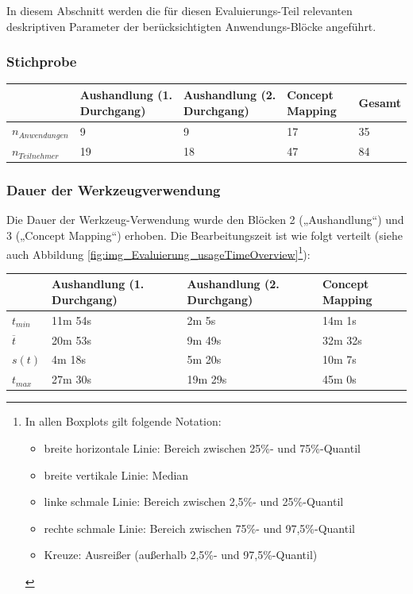 In diesem Abschnitt werden die für diesen Evaluierungs-Teil relevanten deskriptiven Parameter der berücksichtigten Anwendungs-Blöcke angeführt.

\subsubsection{Stichprobe} %

\begin{tabular}{| p{2cm} || p{} | p{} | p{} || p{2cm} |}
  \hline
   & Aushandlung (1. Durchgang) & Aushandlung (2. Durchgang) & Concept Mapping & Gesamt \\ \hline
   $n_{Anwendungen}$ & 9 & 9 & 17 & 35 \\ 
   $n_{Teilnehmer}$ & 19 & 18 & 47 & 84 \\ \hline
\end{tabular} 

\subsubsection{Dauer der Werkzeugverwendung} %

Die Dauer der Werkzeug-Verwendung wurde den Blöcken 2 („Aushandlung“) und 3 („Concept Mapping“) erhoben. Die Bearbeitungszeit ist wie folgt verteilt (siehe auch Abbildung \ref{fig:img_Evaluierung_usageTimeOverview}\footnote{In allen Boxplots gilt folgende Notation: 
\begin{itemize}
	\item breite horizontale Linie: Bereich zwischen 25\%- und 75\%-Quantil
	\item breite vertikale Linie: Median
	\item linke schmale Linie: Bereich zwischen 2,5\%- und 25\%-Quantil
	\item rechte schmale Linie: Bereich zwischen 75\%- und 97,5\%-Quantil
	\item Kreuze: Ausreißer (außerhalb 2,5\%- und 97,5\%-Quantil)
\end{itemize}
}):

\begin{tabular}{| p{1cm} || p{3cm} | p{3cm} | p{3cm} |}
  \hline
   & Aushandlung (1. Durchgang) & Aushandlung (2. Durchgang) & Concept Mapping \\ \hline
   $t_{min}$ & 11m 54s & 2m 5s & 14m 1s \\ 
   $\overline{t}$ & 20m 53s & 9m 49s & 32m 32s \\ 
   $s(t)$ & 4m 18s & 5m 20s & 10m 7s \\
   $t_{max}$ & 27m 30s & 19m 29s & 45m 0s \\ \hline
\end{tabular} 

